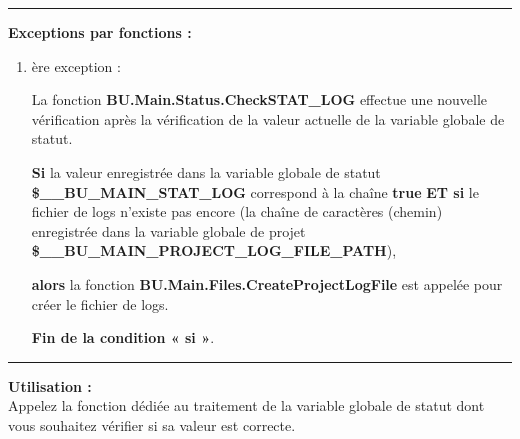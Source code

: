 \documentclass[a4paper,10pt]{article}
\begin{document}

\par\noindent\rule{\textwidth}{0.4pt}

\begin{justify}
    \textbf{Exceptions par fonctions :}
\end{justify}

\begin{justify}
    \begin{enumerate}
        \item
        {
            ère exception :

            \begin{justify}
                La fonction \textbf{\color{func}BU.Main.Status.CheckSTAT\_LOG} effectue une nouvelle vérification après la vérification de la valeur actuelle de la variable globale de statut.
            \end{justify}

            \begin{justify}
                \textbf{\color{cond}Si} la valeur enregistrée dans la variable globale de statut \textbf{\color{vars}\$\_\_BU\_MAIN\_STAT\_LOG} correspond à la chaîne \textbf{true} \textbf{\color{cond}ET si} le fichier de logs n'existe pas encore (la chaîne de caractères (chemin) enregistrée dans la variable globale de projet \textbf{\color{vars}\$\_\_BU\_MAIN\_PROJECT\_LOG\_FILE\_PATH}),
            \end{justify}

            \begin{justify}
                \textbf{\color{cond} alors} la fonction \textbf{\color{func}BU.Main.Files.CreateProjectLogFile} est appelée pour créer le fichier de logs.
            \end{justify}

            \begin{justify}
                \textbf{\color{cond}Fin de la condition « si »}.
            \end{justify}
        }
    \end{enumerate}
\end{justify}


\par\noindent\rule{\textwidth}{0.4pt}

\begin{justify}
    \textbf{Utilisation :}\\[1\baselineskip]
    Appelez la fonction dédiée au traitement de la variable globale de statut dont vous souhaitez vérifier si sa valeur est correcte.
\end{justify}
\end{document}
